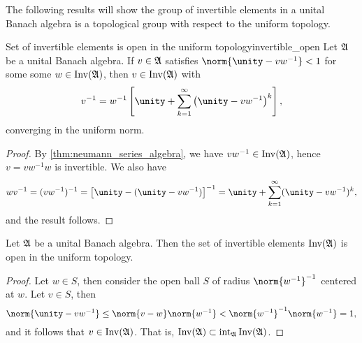The following results will show the group of invertible elements in a unital Banach algebra is a topological group with respect to the uniform topology.
\begin{proposition}{Set of invertible elements is open in the uniform topology}{invertible_open}
    Let \(\mathfrak{A}\) be a unital Banach algebra. If \(v \in \mathfrak{A}\) satisfies \(\norm{\unity - v w^{-1}} < 1\) for some some \(w \in \operatorname{Inv}(\mathfrak{A})\), then \(v \in \operatorname{Inv}(\mathfrak{A})\) with
    \begin{equation*}
        v^{-1} = w^{-1} \left[\unity + \sum_{k=1}^\infty\left(\unity - vw^{-1}\right)^k\right],
    \end{equation*}
    converging in the uniform norm.
\end{proposition}
\begin{proof}
    By \cref{thm:neumann_series_algebra}, we have \(vw^{-1} \in \operatorname{Inv}(\mathfrak{A})\), hence \(v = vw^{-1}w\) is invertible. We also have
    \begin{equation*}
        wv^{-1} = (vw^{-1})^{-1} = \left[\unity - (\unity - vw^{-1})\right]^{-1} = \unity + \sum_{k=1}^\infty (\unity - vw^{-1})^{k},
    \end{equation*}
    and the result follows.
\end{proof}
\begin{corollary}
    Let \(\mathfrak{A}\) be a unital Banach algebra. Then the set of invertible elements \(\operatorname{Inv}(\mathfrak{A})\) is open in the uniform topology.
\end{corollary}
\begin{proof}
    Let \(w \in S\), then consider the open ball \(S\) of radius \(\norm{w^{-1}}^{-1}\) centered at \(w\). Let \(v \in S\), then
    \begin{equation*}
        \norm{\unity - vw^{-1}} \leq \norm{v - w}\norm{w^{-1}} < \norm{w^{-1}}^{-1}\norm{w^{-1}} = 1,
    \end{equation*}
    and it follows that \(v \in \operatorname{Inv}(\mathfrak{A})\). That is, \(\operatorname{Inv}(\mathfrak{A}) \subset \operatorname{int}_{\mathfrak{A}}\operatorname{Inv}(\mathfrak{A})\).
\end{proof}

